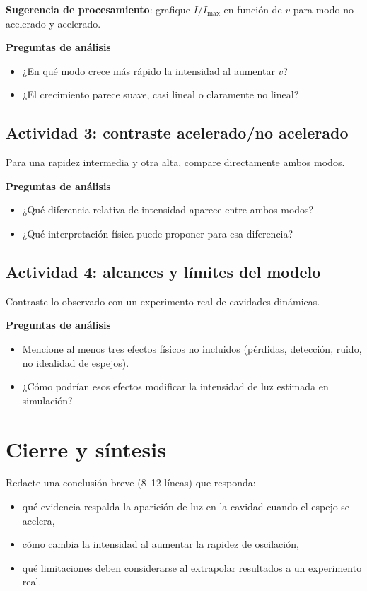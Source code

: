 \documentclass{aa}
\begin{document}
\textbf{Sugerencia de procesamiento}: grafique $I/I_{\max}$ en función de $v$ para modo no acelerado y acelerado.

\textbf{Preguntas de análisis}
\begin{itemize}
  \item ¿En qué modo crece más rápido la intensidad al aumentar $v$?
  \item ¿El crecimiento parece suave, casi lineal o claramente no lineal?
\end{itemize}

\subsection{Actividad 3: contraste acelerado/no acelerado}
Para una rapidez intermedia y otra alta, compare directamente ambos modos.

\textbf{Preguntas de análisis}
\begin{itemize}
  \item ¿Qué diferencia relativa de intensidad aparece entre ambos modos?
  \item ¿Qué interpretación física puede proponer para esa diferencia?
\end{itemize}

\subsection{Actividad 4: alcances y límites del modelo}
Contraste lo observado con un experimento real de cavidades dinámicas.

\textbf{Preguntas de análisis}
\begin{itemize}
  \item Mencione al menos tres efectos físicos no incluidos (pérdidas, detección, ruido, no idealidad de espejos).
  \item ¿Cómo podrían esos efectos modificar la intensidad de luz estimada en simulación?
\end{itemize}

\section{Cierre y síntesis}

Redacte una conclusión breve (8--12 líneas) que responda:
\begin{itemize}
  \item qué evidencia respalda la aparición de luz en la cavidad cuando el espejo se acelera,
  \item cómo cambia la intensidad al aumentar la rapidez de oscilación,
  \item qué limitaciones deben considerarse al extrapolar resultados a un experimento real.
\end{itemize}
\end{document}
